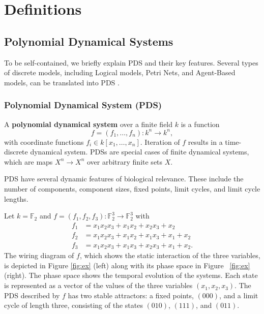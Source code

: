 \documentclass[11pt]{amsart}
\newenvironment{example}[1][Example]{\begin{trivlist}
\item[\hskip \labelsep {\bfseries #1}]}{\end{trivlist}}
\begin{document}
\appendix
 
\section{Definitions}
 
\subsection{Polynomial Dynamical Systems}
To be self-contained, we briefly explain PDS and their key features.
Several types of discrete models, including Logical models, Petri
Nets, and Agent-Based models, can be translated into PDS \cite{Alan:Bioinf2010,Hinkelmann:2010}.
 
\subsubsection{Polynomial Dynamical System (PDS)}
A {\bf polynomial dynamical system} \cite{JLSS} over a finite field $k$ is a function
$$f = (f_1, \ldots, f_n) : k^n \rightarrow k^n,$$
with coordinate functions $f_i \in k[x_1, \ldots , x_n]$. Iteration of $f$ results
in a time-discrete dynamical system. PDSs are special cases of finite
dynamical systems, which are maps $X^n \rightarrow   X^n$ over arbitrary
finite sets $X$.
 
PDS have several dynamic features of biological
relevance. These include the number of components, component sizes, fixed
points, limit cycles, and limit cycle lengths.
\begin{example}
Let $k= \mathbb F_2$ and $f = (f_1, f_2, f_3) : \mathbb F_2^3 \rightarrow
\mathbb F_2^3$ with
\begin{align*}
f_1 &= x_1x_2x_3+x_1x_2+x_2x_3+x_2 \\
f_2 &= x_1x_2x_3+x_1x_2+x_1x_3+x_1+x_2 \\
f_3 &= x_1x_2x_3+x_1x_3+x_2x_3+x_1+x_2.
\end{align*}
The wiring diagram of $f$, which shows the static interaction of the three
variables, is
depicted in Figure \ref{fig:ex} (left) along with its phase space in Figure
~\ref{fig:ex} (right).
The phase space shows the temporal evolution of the systems. Each state is
represented as a vector of the values of the three variables $(x_1, x_2,
x_3)$.
The PDS described by $f$ has
two stable attractors: a fixed points, $(000)$, and a limit cycle of length
three, consisting of the states $(010)$, $(111)$, and $(011)$.
\end{example}
 
\end{document}

